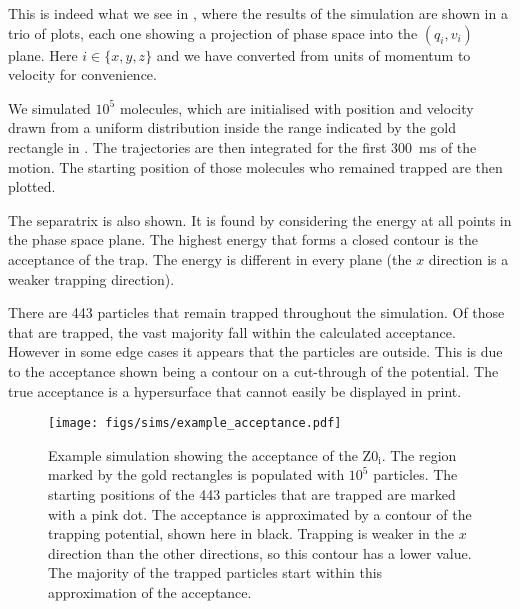 This is indeed what we see in , where the
results of the simulation are shown in a trio of plots, each one showing a
projection of phase space into the $(q_i, v_i)$ plane. Here $i\in\{x, y, z\}$
and we have converted from units of momentum to velocity for convenience. 

We simulated $10^5$ \CaF{} molecules, which are initialised with position and
velocity drawn from a uniform distribution inside the range indicated by the
gold rectangle in . The trajectories are then
integrated for the first \SI{300}{\milli\second} of the motion. The starting
position of those molecules who remained trapped are then plotted.

The separatrix is also shown. It is found by considering the energy at all
points in the phase space plane. The highest energy that forms a closed contour
is the acceptance of the trap. The energy is different in every plane (the $x$
direction is a weaker trapping direction).

There are 443 particles that remain trapped throughout the simulation.  Of those
that are trapped, the vast majority fall within the calculated acceptance.
However in some edge cases it appears that the particles are outside. This is
due to the acceptance shown being a contour on a cut-through of the potential.
The true acceptance is a hypersurface that cannot easily be displayed in print.

%
\begin{figure}
  \centering
  \texttt{[image: figs/sims/example\_acceptance.pdf]}
  \caption{Example simulation showing the acceptance of the $\mathrm{Z0_i}$.
  The region marked by the gold rectangles is populated with $10^5$ particles.
  The starting positions of the 443 particles that are trapped are marked with a pink dot.
  The acceptance is approximated by a contour of the trapping potential, shown
  here in black. Trapping is weaker in the $x$ direction than the other
  directions, so this contour has a lower value. The majority of the trapped
  particles start within this approximation of the acceptance.}
  \label{design:fig:acceptance}
\end{figure}

